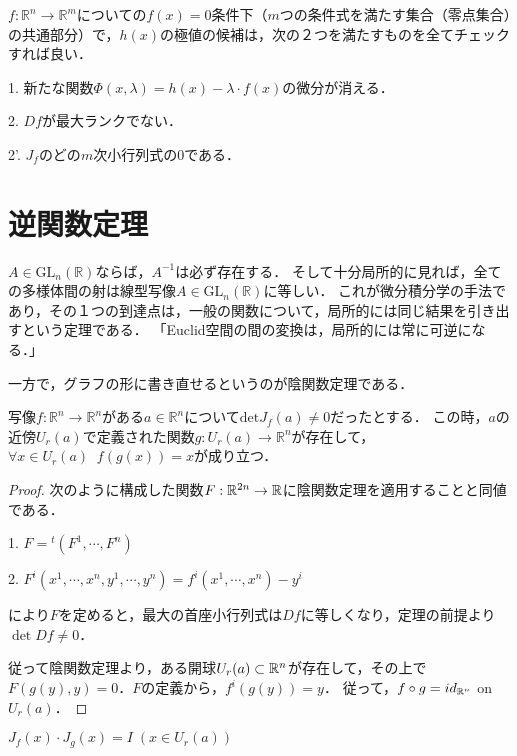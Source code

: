\documentclass[uplatex, dvipdfmx]{jsreport}
\begin{document}
\begin{screen}
    $f:\mathbb{R}^n\to\mathbb{R}^m$についての$f(x)=0$条件下（$m$つの条件式を満たす集合（零点集合）の共通部分）で，$h(x)$の極値の候補は，次の２つを満たすものを全てチェックすれば良い．

    1. 新たな関数$\Phi(x,\lambda)=h(x)-\lambda\cdot f(x)$の微分が消える．

    2. $Df$が最大ランクでない．

    2'. $J_f$のどの$m$次小行列式の$0$である．
\end{screen}

\section{逆関数定理}

$A\in \mathrm{GL}_n(\mathbb{R})$ならば，$A^{-1}$は必ず存在する．
そして十分局所的に見れば，全ての多様体間の射は線型写像$A\in \mathrm{GL}_n(\mathbb{R})$に等しい．
これが微分積分学の手法であり，その１つの到達点は，一般の関数について，局所的には同じ結果を引き出すという定理である．
「Euclid空間の間の変換は，局所的には常に可逆になる．」

一方で，グラフの形に書き直せるというのが陰関数定理である．

\begin{theorem}[逆関数定理１：存在]
    写像$f:\mathbb{R}^n\to\mathbb{R}^n$がある$a\in\mathbb{R}^n$について$\mathrm{det}J_f(a)\ne 0$だったとする．
    この時，$a$の近傍$U_r(a)$で定義された関数$g:U_r(a)\to\mathbb{R}^n$が存在して，$\forall x\in U_r(a)\;\; f(g(x))=x$が成り立つ．
\end{theorem}
\begin{proof}
    次のように構成した関数$F:\mathbb{R}^{2n}\to\mathbb{R}$に陰関数定理を適用することと同値である．

    1. $F={}^t(F^1,\cdots,F^n)$

    2. $F^i(x^1,\cdots,x^n,y^1,\cdots,y^n)=f^i(x^1,\cdots,x^n)-y^i$

    により$F$を定めると，最大の首座小行列式は$Df$に等しくなり，定理の前提より$\det Df\ne 0$．

    従って陰関数定理より，ある開球$U_r(a)\subset\mathbb{R}^n$が存在して，その上で$F(g(y),y)=0$．$F$の定義から，$f^i(g(y))=y$．
    従って，$f\circ g=id_{\mathbb{R}^n}$ on $U_r(a)$．
\end{proof}

\begin{theorem}
    $J_f(x)\cdot J_g(x)=I\;(x\in U_r(a))$
\end{theorem}
\end{document}
